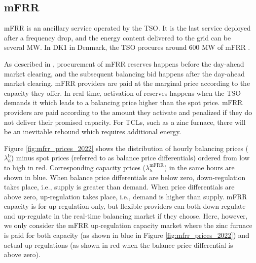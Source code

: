 \documentclass[lettersize,journal]{IEEEtran}
\begin{document}
\subsection{mFRR}

mFRR is an ancillary service operated by the TSO. It is the last service deployed after a frequency drop, and the energy content delivered to the grid can be several MW. In DK1 in Denmark, the TSO procures around 600 MW of mFRR \cite{energinet:scenario_report_2022}.

As described in \cite{gade2023load}, procurement of mFRR reserves happens before the day-ahead market clearing, and the subsequent balancing bid happens after the day-ahead market clearing. mFRR providers are paid at the marginal price according to the capacity they offer. In real-time, activation of reserves happens when the TSO demands it which leads to a balancing price higher than the spot price. mFRR providers are paid according to the amount they activate and penalized if they do not deliver their promised capacity. For TCLs, such as a zinc furnace, there will be an inevitable rebound which requires additional energy.

Figure \ref{fig:mfrr_prices_2022} shows the distribution of hourly balancing prices ($\lambda_{h}^{\text{b}}$) minus spot prices (referred to as balance price differentials) ordered from low to high in red. Corresponding capacity prices ($\lambda_{h}^{\text{mFRR}}$) in the same hours are shown in blue. When balance price differentials are below zero, down-regulation takes place, i.e., supply is greater than demand. When price differentials are above zero, up-regulation takes place, i.e., demand is higher than supply. mFRR capacity is for up-regulation only, but flexible providers can both down-regulate and up-regulate in the real-time balancing market if they choose. Here, however, we only consider the mFRR up-regulation capacity market where the zinc furnace is paid for both capacity (as shown in blue in Figure \ref{fig:mfrr_prices_2022}) and actual up-regulations (as shown in red when the balance price differential is above zero).
\end{document}
